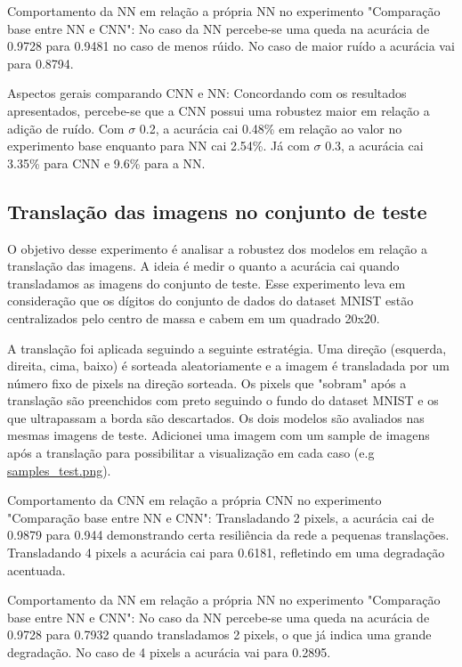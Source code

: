 \documentclass[11pt,a4paper]{article}
\begin{document}
Comportamento da NN em relação a própria NN no experimento "Comparação base entre NN e CNN": No caso da NN percebe-se uma queda na acurácia de 0.9728 para 0.9481 no caso de menos rúido. No caso de maior ruído a acurácia vai para 0.8794.

Aspectos gerais comparando CNN e NN: Concordando com os resultados apresentados, percebe-se que a CNN possui uma robustez maior em relação a adição de ruído. Com $\sigma$ 0.2, a acurácia cai 0.48\% em relação ao valor no experimento base enquanto para NN cai 2.54\%. Já com $\sigma$ 0.3, a acurácia cai 3.35\% para CNN e 9.6\% para a NN.

\subsection{Translação das imagens no conjunto de teste}
O objetivo desse experimento é analisar a robustez dos modelos em relação a translação das imagens. A ideia é medir o quanto a acurácia cai quando transladamos as imagens do conjunto de teste. Esse experimento leva em consideração que os dígitos do conjunto de dados do dataset MNIST estão centralizados pelo centro de massa e cabem em um quadrado 20x20.

A translação foi aplicada seguindo a seguinte estratégia. Uma direção (esquerda, direita, cima, baixo) é sorteada aleatoriamente e a imagem é transladada por um número fixo de pixels na direção sorteada. Os pixels que "sobram" após a translação são preenchidos com preto seguindo o fundo do dataset MNIST e os que ultrapassam a borda são descartados. Os dois modelos são avaliados nas mesmas imagens de teste. Adicionei uma imagem com um sample de imagens após a translação para possibilitar a visualização em cada caso (e.g \href{https://github.com/deconr/MAC5921-DeepLearning/blob/main/ep1/results/test_translate_2px/samples_test.png}{samples\_test.png}).

Comportamento da CNN em relação a própria CNN no experimento "Comparação base entre NN e CNN": Transladando 2 pixels, a acurácia cai de 0.9879 para 0.944 demonstrando certa resiliência da rede a pequenas translações. Transladando 4 pixels a acurácia cai para 0.6181, refletindo em uma degradação acentuada.

Comportamento da NN em relação a própria NN no experimento "Comparação base entre NN e CNN": No caso da NN percebe-se uma queda na acurácia de 0.9728 para 0.7932 quando transladamos 2 pixels, o que já indica uma grande degradação. No caso de 4 pixels a acurácia vai para 0.2895.
\end{document}
